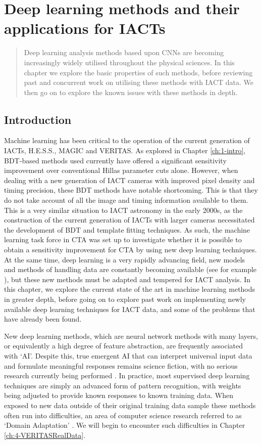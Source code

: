 \chapter{\label{ch:2-CNNs}Deep learning methods and their applications for IACTs}
\minitoc
\begin{abstract}
    Deep learning analysis methods based upon CNNs are becoming increasingly widely utilised throughout the physical sciences. In this chapter we explore the basic properties of such methods, before reviewing past and concurrent work on utilising these methods with IACT data. We then go on to explore the known issues with these methods in depth.
\end{abstract}

\section{Introduction}

Machine learning has been critical to the operation of the current generation of IACTs, H.E.S.S., MAGIC and VERITAS. As explored in Chapter \ref{ch:1-intro}, BDT-based methods used currently have offered a significant sensitivity improvement over conventional Hillas parameter cuts alone. However, when dealing with a new generation of IACT cameras with improved pixel density and timing precision, these BDT methods have notable shortcoming. This is that they do not take account of all the image and timing information available to them. This is a very similar situation to IACT astronomy in the early 2000s, as the construction of the current generation of IACTs with larger cameras necessitated the development of BDT and template fitting techniques. As such, the machine learning task force in CTA was set up to investigate whether it is possible to obtain a sensitivity improvement for CTA by using new deep learning techniques. At the same time, deep learning is a very rapidly advancing field, new models and methods of handling data are constantly becoming available (see for example \cite{adithesis} \cite{chebnet}), but these new methods must be adapted and tempered for IACT analysis. In this chapter, we explore the current state of the art in machine learning methods in greater depth, before going on to explore past work on implementing newly available deep learning techniques for IACT data, and some of the problems that have already been found. 

New deep learning methods, which are neural network methods with many layers, or equivalently a high degree of feature abstraction, are frequently associated with `AI'. Despite this, true emergent AI that can interpret universal input data and formulate meaningful responses remains science fiction, with no serious research currently being performed \cite{emergent}. In practice, most supervised deep learning techniques are simply an advanced form of pattern recognition, with weights being adjusted to provide known responses to known training data. When exposed to new data outside of their original training data sample these methods often run into difficulties, an area of computer science research referred to as `Domain Adaptation' \cite{wilson}. We will begin to encounter such difficulties in Chapter \ref{ch:4-VERITASRealData}.

